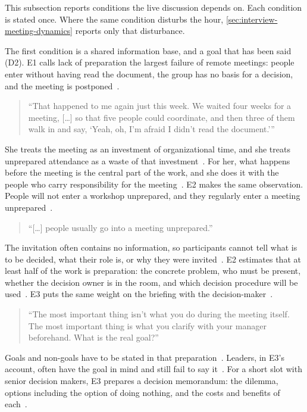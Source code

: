 This subsection reports conditions the live discussion depends on.
Each condition is stated once.
Where the same condition disturbs the hour, \autoref{sec:interview-meeting-dynamics}
reports only that disturbance.

The first condition is a shared information base, and a goal that has been said (D2).
E1 calls lack of preparation the largest failure of remote meetings: people enter without
having read the document, the group has no basis for a decision, and the meeting is
postponed~.
{\setlength{\topsep}{0.25\baselineskip}\setlength{\partopsep}{0pt}%
  \begin{quote}\small
    \enquote{That happened to me again just this week. We waited four weeks for a meeting, [\ldots] so that
      five people could coordinate, and then three of them walk in and say, \enquote{Yeah, oh, I'm afraid I
    didn't read the document.}}~
\end{quote}}
She treats the meeting as an investment of organizational time, and she treats unprepared
attendance as a waste of that investment~.
For her, what happens before the meeting is the central part of the work, and she does it
with the people who carry responsibility for the meeting~.
E2 makes the same observation.
People will not enter a workshop unprepared, and they regularly enter a meeting
unprepared~.
{\setlength{\topsep}{0.25\baselineskip}\setlength{\partopsep}{0pt}%
  \begin{quote}\small
    \enquote{[\ldots] people usually go into a meeting unprepared.}~
\end{quote}}
The invitation often contains no information, so participants cannot tell what is to be
decided, what their role is, or why they were invited~.
E2 estimates that at least half of the work is preparation: the concrete problem, who must be
present, whether the decision owner is in the room, and which decision procedure will be
used~.
E3 puts the same weight on the briefing with the decision-maker~.
{\setlength{\topsep}{0.25\baselineskip}\setlength{\partopsep}{0pt}%
  \begin{quote}\small
    \enquote{The most important thing isn't what you do during the meeting itself. The most important thing
    is what you clarify with your manager beforehand. What is the real goal?}~
\end{quote}}
Goals and non-goals have to be stated in that preparation~.
Leaders, in E3's account, often have the goal in mind and still fail to say it~.
For a short slot with senior decision makers, E3 prepares a decision memorandum: the dilemma,
options including the option of doing nothing, and the costs and benefits of
each~.

